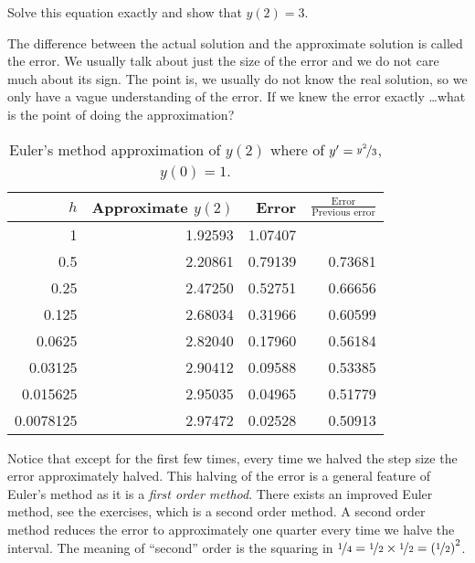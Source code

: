 \documentclass{ximera}
\begin{document}
\begin{exercise}
    Solve this equation exactly and show that $y(2) = 3$.
\end{exercise}

The difference between the actual solution and the approximate solution is called the error.  We usually talk about just the size of the error and we do not care much about its sign.  The point is, we usually do not know the real solution, so we only have a vague understanding of the error.  If we knew the error exactly \ldots what is the point of doing the approximation?

\begin{table}[h!t]
    \mybeginframe
    \capstart
    \begin{center}
        \begin{tabular}{@{}rrrr@{}}
            \toprule
            $h$ & Approximate $y(2)$ & Error & $\frac{\text{Error}}{\text{Previous error}}$ \\
            \midrule
            1        & 1.92593 & 1.07407 & \\
            0.5      & 2.20861 & 0.79139 & 0.73681 \\
            0.25     & 2.47250 & 0.52751 & 0.66656 \\
            0.125    & 2.68034 & 0.31966 & 0.60599 \\
            0.0625   & 2.82040 & 0.17960 & 0.56184 \\
            0.03125  & 2.90412 & 0.09588 & 0.53385 \\
            0.015625 & 2.95035 & 0.04965 & 0.51779 \\
            0.0078125& 2.97472 & 0.02528 & 0.50913 \\
            \bottomrule
        \end{tabular}
    \end{center}
    \caption{Euler's method approximation of $y(2)$ where of $y'=\nicefrac{y^2}{3}$, $y(0)=1$.\label{euler-table:table}}
    \myendframe
\end{table}

Notice that except for the first few times, every time we halved the step size the error approximately halved. This halving of the error is a general feature of Euler's method as it is a
\emph{first order method}. 
There exists an improved Euler method, see the exercises, which is a second order method. A second order method reduces the error to approximately one quarter every time we halve the interval.  The meaning of ``second'' order is the squaring in $\nicefrac{1}{4} = \nicefrac{1}{2} \times \nicefrac{1}{2} = {(\nicefrac{1}{2})}^2$.
\end{document}
